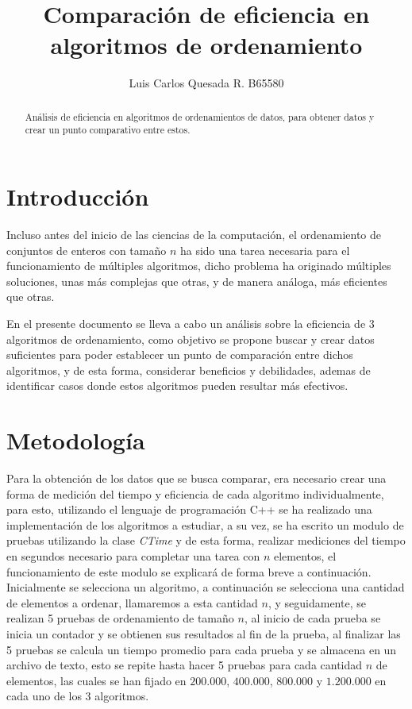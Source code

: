 \documentclass[twocolumn,english,journal]{IEEEtran}
\begin{document}
\title{Comparación de eficiencia en algoritmos de ordenamiento}
\author{Luis Carlos Quesada R.	B65580}
\maketitle

\begin{abstract}
Análisis de eficiencia en algoritmos de ordenamientos de datos, para obtener datos y crear un punto comparativo entre estos.
\end{abstract}

\section{Introducción} \label{Introducción}
Incluso antes del inicio de las ciencias de la computación, el ordenamiento de conjuntos de enteros con tamaño $n$ ha sido una tarea necesaria para el funcionamiento de múltiples algoritmos, dicho problema ha originado múltiples soluciones, unas más complejas que otras, y de manera análoga, más eficientes que otras.	

En el presente documento se lleva a cabo un análisis sobre la eficiencia de 3 algoritmos de ordenamiento, como objetivo se propone buscar y crear datos suficientes para poder establecer un punto de comparación entre dichos algoritmos, y de esta forma, considerar beneficios y debilidades, ademas de identificar casos donde estos algoritmos pueden resultar más efectivos.

\section{Metodología} \label{Metodología}
Para la obtención de los datos que se busca comparar, era necesario crear una forma de medición del tiempo y eficiencia de cada algoritmo individualmente, para esto, utilizando el lenguaje de programación C++ se ha realizado una implementación de los algoritmos a estudiar, a su vez, se ha escrito un modulo de pruebas utilizando la clase \emph{CTime} y de esta forma, realizar mediciones del tiempo en segundos necesario para completar una tarea con $n$ elementos, el funcionamiento de este modulo se explicará de forma breve a continuación.	Inicialmente se selecciona un algoritmo, a continuación se selecciona una cantidad de elementos a ordenar, llamaremos a esta cantidad $n$, y seguidamente, se realizan 5 pruebas de ordenamiento de tamaño $n$, al inicio de cada prueba se inicia un contador y se obtienen sus resultados al fin de la prueba, al finalizar las 5 pruebas se calcula un tiempo promedio para cada prueba y se almacena en un archivo de texto, esto se repite hasta hacer 5 pruebas para cada cantidad $n$ de elementos, las cuales se han fijado en $200.000$, $400.000$, $800.000$ y $1.200.000$ en cada uno de los 3 algoritmos.
\end{document}
